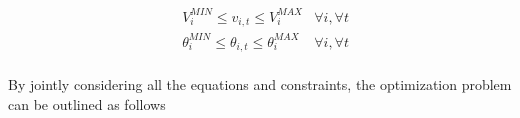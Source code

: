 \begin{subequations}
\begin{align*}
&V_{i}^{MIN} \leq v_{i,t} \leq V_{i}^{MAX} &\forall i,\forall t  \\
&\theta_{i}^{MIN} \leq \theta_{i,t}  \leq \theta_{i}^{MAX}  &\forall i,\forall t  \\ 
\end{align*}
\end{subequations}


\newpage
By jointly considering all the equations and constraints, the optimization problem can be outlined as follows
